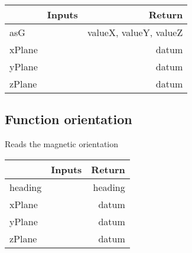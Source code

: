\documentclass[a4paper,12pt,oneside,pdflatex,italian,final,twocolumn]{article}
\begin{document}
\centering
\begin{tabular}{lcr}
\toprule
  & Inputs & Return \\
\midrule
asG &
&
valueX, 
valueY, 
valueZ
\\
xPlane &
&
datum
\\
yPlane &
&
datum
\\
zPlane &
&
datum
\\
\bottomrule
\end{tabular}



\raggedright
\subsection{Function orientation }
Reads the magnetic orientation \\

\centering
\begin{tabular}{lcr}
\toprule
  & Inputs & Return \\
\midrule
heading &
&
heading
\\
xPlane &
&
datum
\\
yPlane &
&
datum
\\
zPlane &
&
datum
\\
\bottomrule
\end{tabular}



\raggedright
\end{document}
